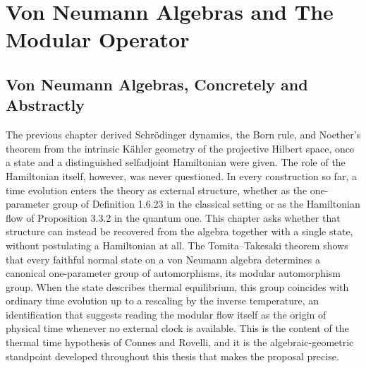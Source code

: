 
\setlength{\headwidth}{\textwidth}


\setcounter{chapter}{3}
\chapter{Von Neumann Algebras and The Modular Operator}
\section{Von Neumann Algebras, Concretely and Abstractly}\label{sec:vn-algebras}

The previous chapter derived Schr\"odinger dynamics, the Born rule, and
Noether's theorem from the intrinsic K\"ahler geometry of the projective
Hilbert space, once a state and a distinguished selfadjoint Hamiltonian
were given. The role of the Hamiltonian itself, however, was never
questioned. In every construction so far, a time evolution enters the
theory as external structure, whether as the one-parameter group of
Definition 1.6.23 in the classical setting or as the Hamiltonian flow of
Proposition 3.3.2 in the quantum one. This chapter asks whether that
structure can instead be recovered from the algebra together with a
single state, without postulating a Hamiltonian at all. The
Tomita--Takesaki theorem shows that every faithful normal state on a von
Neumann algebra determines a canonical one-parameter group of
automorphisms, its modular automorphism group. When the state describes
thermal equilibrium, this group coincides with ordinary time evolution
up to a rescaling by the inverse temperature, an identification that
suggests reading the modular flow itself as the origin of physical time
whenever no external clock is available. This is the content of the
thermal time hypothesis of Connes and Rovelli, and it is the
algebraic-geometric standpoint developed throughout this thesis that
makes the proposal precise.


